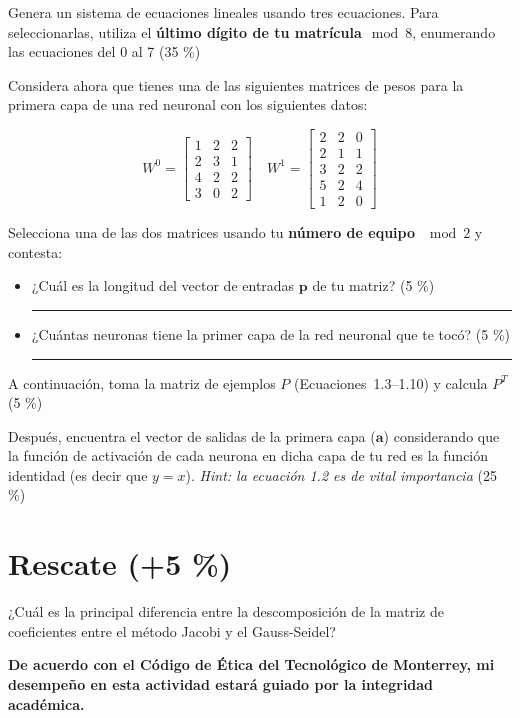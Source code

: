 \documentclass{article}
\newcommand{\responserule}{{\large\rule{14 cm}{0.3mm}}}
\begin{document}
Genera un sistema de ecuaciones lineales usando tres ecuaciones. Para seleccionarlas, utiliza el \textbf{último dígito de tu matrícula}$\mod 8$, enumerando las ecuaciones del 0 al 7 (35 \%)

Considera ahora que tienes una de las siguientes matrices de pesos para la primera capa de una red neuronal con los siguientes datos:

\[
    W^0 = \begin{bmatrix}
        1 & 2 & 2 \\
        2 & 3 & 1 \\
        4 & 2 & 2 \\
        3 & 0 & 2
    \end{bmatrix} \quad W^1=
    \begin{bmatrix}
        2 & 2 & 0 \\
        2 & 1 & 1 \\
        3 & 2 & 2 \\
        5 & 2 & 4 \\
        1 & 2 & 0
    \end{bmatrix}
\]

Selecciona una de las dos matrices usando tu \textbf{número de equipo} $\mod 2$ y contesta:

\begin{itemize}
    \itemsep2.5ex
    \item ¿Cuál es la longitud del vector de entradas $\mathbf{p}$ de tu matriz? (5 \%)\\ \responserule
    \item ¿Cuántas neuronas tiene la primer capa de la red neuronal que te tocó? (5 \%)\\ \responserule
\end{itemize}

A continuación, toma la matriz de ejemplos $P$ (Ecuaciones~1.3--1.10) y calcula $P^T$ (5 \%)

\vspace{2.5ex}

Después, encuentra el vector de salidas de la primera capa ($\mathbf{a}$) considerando que la función de activación de cada neurona en dicha capa de tu red es la función identidad (es decir que $y = x$). \textit{\footnotesize Hint: la ecuación 1.2 es de vital importancia} (25 \%)


\section*{Rescate (+5 \%)}

¿Cuál es la principal diferencia entre la descomposición de la matriz de coeficientes entre el método Jacobi y el Gauss-Seidel?

\vfill

\textbf{De acuerdo con el Código de Ética del Tecnológico de Monterrey, mi desempeño en esta actividad estará guiado por la integridad académica.}
\end{document}
